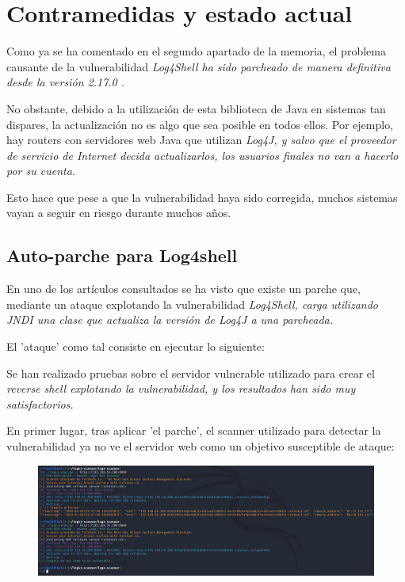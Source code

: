 \documentclass[../main.tex]{subfiles}
\begin{document}
\section{Contramedidas y estado actual}

Como ya se ha comentado en el segundo apartado de la memoria, el problema causante de la vulnerabilidad \it{Log4Shell} ha sido parcheado de manera definitiva desde la versión \it{2.17.0} \cite{lunasec-log4shell-mitigation}.

No obstante, debido a la utilización de esta biblioteca de Java en sistemas tan dispares, la actualización no es algo que sea posible en todos ellos. Por ejemplo, hay routers con servidores web Java que utilizan \it{Log4J}, y salvo que el proveedor de servicio de Internet decida actualizarlos, los usuarios finales no van a hacerlo por su cuenta.

Esto hace que pese a que la vulnerabilidad haya sido corregida, muchos sistemas vayan a seguir en riesgo durante muchos años.

\subsection{Auto-parche para Log4shell}

En uno de los artículos consultados se ha visto que existe un parche \cite{autopatch} que, mediante un ataque explotando la vulnerabilidad \it{Log4Shell}, carga utilizando \it{JNDI} una clase que actualiza la versión de \it{Log4J} a una parcheada.

El 'ataque' como tal consiste en ejecutar lo siguiente:

Se han realizado pruebas sobre el servidor vulnerable utilizado para crear el \it{reverse shell} explotando la vulnerabilidad, y los resultados han sido muy satisfactorios.

En primer lugar, tras aplicar 'el parche', el scanner utilizado para detectar la vulnerabilidad ya no ve el servidor web como un objetivo susceptible de ataque:
\begin{figure}[H]
\centering
\includegraphics[width=15.0cm]{imagenes/5-Mitigation/scanner_before-after-patching.png}
\end{figure}
\end{document}
